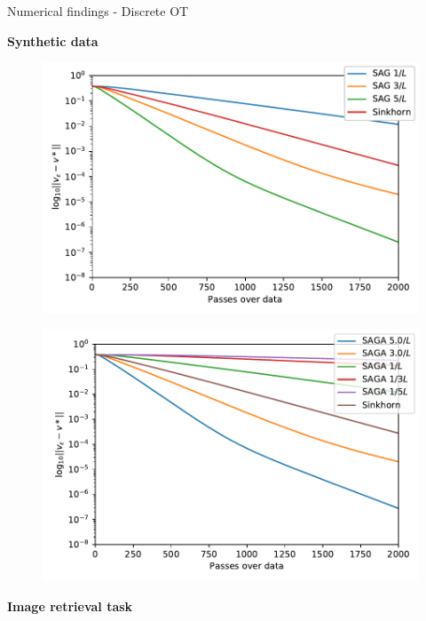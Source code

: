 \documentclass{beamer}
\begin{document}
\begin{frame}{Numerical findings - Discrete OT}
    \begin{minipage}{.4\linewidth}
        \textbf{Synthetic data}
        \begin{figure}
            \includegraphics[width=\linewidth]{figures/lr_bench_sag.pdf}
        \end{figure}
        \begin{figure}
            \includegraphics[width=\linewidth]{figures/lr_bench_saga.pdf}
        \end{figure}
    \end{minipage}
    \hfill
    \vline
    \hfill
    \begin{minipage}{.4\linewidth}
        \textbf{Image retrieval task}
        \begin{figure}

\end{figure}
\end{minipage}
\end{frame}
\end{document}
